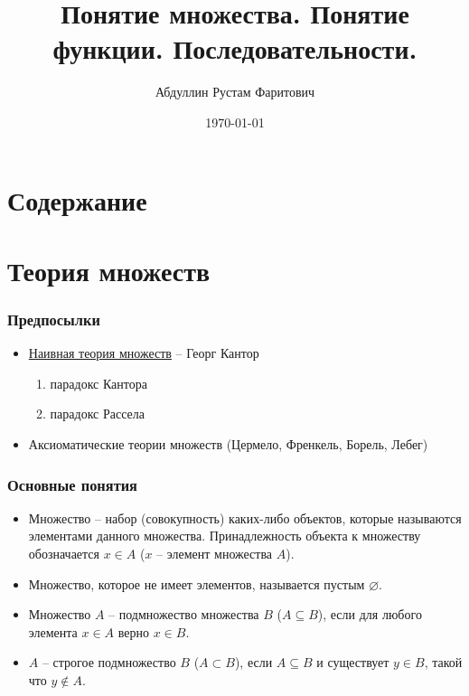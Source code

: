 \documentclass[10pt]{beamer}
\title[]{Понятие множества. Понятие функции. Последовательности.}
\author[]{Абдуллин Рустам Фаритович}
\institute[НГУ]
{
    \vspace{0.5cm}
    \begin{minipage}{0.6\linewidth}
        \begin{center}
            \scriptsize
            \textbf{ НОВОСИБИРСКИЙ ГОСУДАРСТВЕННЫЙ УНИВЕРСИТЕТ, НГУ}
        \end{center}
    \end{minipage}
}
\date{\today}
\numberwithin{equation}{subsection}
\begin{document}
    \begin{frame}
        \titlepage
    \end{frame}

    \section*{Содержание}
    \begin{frame}
        \tableofcontents
    \end{frame}

    \section{Теория множеств}
    \begin{frame}
        \frametitle{Предпосылки}
        \begin{itemize}
            \item \href{https://en.wikipedia.org/wiki/Set_theory}{Наивная теория множеств} -- Георг Кантор \\
                \begin{enumerate}
                    \item парадокс Кантора
                    \item парадокс Рассела
                \end{enumerate}
            \item Аксиоматические теории множеств (Цермело, Френкель, Борель, Лебег)
        \end{itemize}
    \end{frame}

    \begin{frame}
        \frametitle{Основные понятия}
        \begin{itemize}
            \item Множество -- набор (совокупность) каких-либо объектов, которые называются элементами данного множества. Принадлежность объекта к множеству обозначается
            $ x \in A$ ($x$ -- элемент множества $A$).
            \item Множество, которое не имеет элементов, называется пустым $\varnothing $.
            \item Множество $A$ -- подмножество множества $B$ ($A \subseteq B$), если для любого элемента $x \in A$ верно $x \in B$.
            \item $A$ -- строгое подмножество $B$ ($A \subset B$), если $A \subseteq B$ и существует $y \in B$, такой что $y \notin A$.
        \end{itemize}
    \end{frame}
\end{document}
